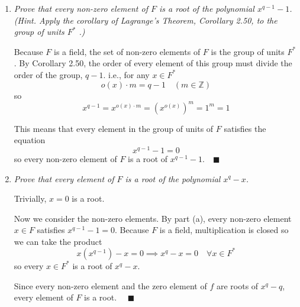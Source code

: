 \documentclass[12pt]{article}
\newcommand{\Z}{\mathbb{Z}}
\newcommand{\qed}{\quad \blacksquare}
\begin{document}
    \begin{enumerate}[label=(\alph*)]
        \item \emph{Prove that every non-zero element of $F$ is a root of the polynomial $x^{q-1} - 1$. (Hint. Apply the corollary of Lagrange's Theorem, Corollary 2.50, to the group of units $F^*$ .)}
        
            \color{blue}
                Because $F$ is a field, the set of non-zero elements of $F$ is the group of units $F^*$. By Corollary 2.50, the order of every element of this group must divide the order of the group, $q - 1$. i.e., for any $x \in F^*$
                \[o(x) \cdot m = q - 1 \quad (m \in \Z)\] 
                so
                \[x^{q - 1} = x^{o(x) \cdot m} = (x^{o(x)})^m = 1^m = 1\]

                This means that every element in the group of units of $F$ satisfies the equation
                \[x^{q-1} - 1 = 0\]
                so every non-zero element of $F$ is a root of $x^{q-1} - 1. \qed$
            \color{black}

        \item \emph{Prove that every element of $F$ is a root of the polynomial $x^q - x$.} 
        
            \color{blue}
                Trivially, $x = 0$ is a root. 

                Now we consider the non-zero elements. By part (a), every non-zero element $x \in F$ satisfies $x^{q-1} - 1 = 0$. Because $F$ is a field, multiplication is closed so we can take the product 
                \[x(x^{q-1}) - x = 0 \implies x^{q} - x = 0 \quad \forall x \in F^*\]
                so every $x \in F^*$ is a root of $x^q - x$. 

                Since every non-zero element and the zero element of $f$ are roots of $x^q - q$, every element of $F$ is a root. $\qed$
            \color{black}
    \end{enumerate}
\end{document}
